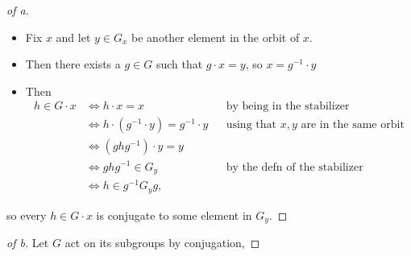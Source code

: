 \begin{solution}

\envlist

\begin{proof}[of a]

\envlist

\begin{itemize}
\tightlist
\item
  Fix \(x\) and let \(y\in G_x\) be another element in the orbit of
  \(x\).
\item
  Then there exists a \(g\in G\) such that \(g\cdot x = y\), so
  \(x = g^{-1}\cdot y\)
\item
  Then
  \begin{align*}
  h \in G\cdot x 
  &\iff h\cdot x = x && \text{by being in the stabilizer} \\
  &\iff h\cdot (g^{-1}\cdot y) = g^{-1}\cdot y && \text{using that $x, y$ are in the same orbit} \\
  &\iff (g h g^{-1}) \cdot y = y \\
  &\iff ghg^{-1}\in G_y && \text{by the defn of the stabilizer}\\
  &\iff h\in g ^{-1}  G_y g
  ,\end{align*}
\end{itemize}

so every \(h\in G\cdot x\) is conjugate to some element in \(G_y\).

\end{proof}

\begin{proof}[of b]

Let \(G\) act on its subgroups by conjugation,


\end{proof}
\end{solution}
